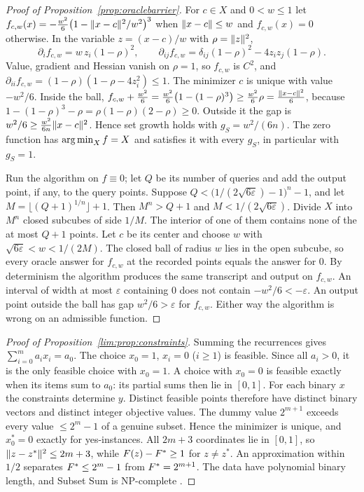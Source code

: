 \begin{proof}[Proof of Proposition~\ref{prop:oraclebarrier}]
For $c\in X$ and $0<w\le1$ let
$f_{c,w}(x)=-\frac{w^2}6\bigl(1-\lVert x-c\rVert^2/w^2\bigr)^3$ when
$\lVert x-c\rVert\le w$ and $f_{c,w}(x)=0$ otherwise. In the variable $z=(x-c)/w$
with $\rho=\lVert z\rVert^2$,
\[
\partial_if_{c,w}=w\,z_i(1-\rho)^2,\qquad
\partial_{ij}f_{c,w}=\delta_{ij}(1-\rho)^2-4z_iz_j(1-\rho).
\]
Value, gradient and Hessian vanish on $\rho=1$, so $f_{c,w}$ is $C^2$, and
$\partial_{ii}f_{c,w}=(1-\rho)(1-\rho-4z_i^2)\le1$. The minimizer $c$ is
unique with value $-w^2/6$. Inside the ball,
$f_{c,w}+\frac{w^2}6=\frac{w^2}6\bigl(1-(1-\rho)^3\bigr)\ge\frac{w^2}6\rho
=\frac{\lVert x-c\rVert^2}6$, because $1-(1-\rho)^3-\rho=\rho(1-\rho)(2-\rho)\ge0$.
Outside it the gap is $w^2/6\ge\frac{w^2}{6n}\lVert x-c\rVert^2$. Hence set growth
holds with $g_S=w^2/(6n)$. The zero function has $\operatorname*{arg\,min}_Xf=X$ and satisfies
it with every $g_S$, in particular with $g_S=1$.

Run the algorithm on $f\equiv0$; let $Q$ be its number of queries and add
the output point, if any, to the query points. Suppose
$Q<\bigl(1/(2\sqrt{6\varepsilon})-1\bigr)^n-1$, and let
$M=\lfloor(Q+1)^{1/n}\rfloor+1$. Then $M^n>Q+1$ and $M<1/(2\sqrt{6\varepsilon})$.
Divide $X$ into $M^n$ closed subcubes of side $1/M$. The interior of one of
them contains none of the at most $Q+1$ points. Let $c$ be its center and
choose $w$ with $\sqrt{6\varepsilon}<w<1/(2M)$. The closed ball of radius $w$
lies in the open subcube, so every oracle answer for $f_{c,w}$ at the
recorded points equals the answer for $0$. By determinism the algorithm
produces the same transcript and output on $f_{c,w}$. An interval of width at
most $\varepsilon$ containing $0$ does not contain $-w^2/6<-\varepsilon$. An
output point outside the ball has gap $w^2/6>\varepsilon$ for $f_{c,w}$.
Either way the algorithm is wrong on an admissible function.
\end{proof}

\begin{proof}[Proof of Proposition~\ref{lim:prop:constraints}]
Summing the recurrences gives $\sum_{i=0}^ma_ix_i=a_0$. The choice $x_0=1$,
$x_i=0$ ($i\ge1$) is feasible. Since all $a_i>0$, it is the only feasible
choice with $x_0=1$. A choice with $x_0=0$ is feasible exactly when its
items sum to $a_0$: its partial sums then lie in $[0,1]$. For each binary $x$
the constraints determine $y$. Distinct feasible points therefore have
distinct binary vectors and distinct integer objective values. The dummy
value $2^{m+1}$ exceeds every value $\le2^m-1$ of a genuine subset. Hence
the minimizer is unique, and $x_0^*=0$ exactly for yes-instances. All
$2m+3$ coordinates lie in $[0,1]$, so $\lVert z-z^*\rVert^2\le2m+3$, while
$F(z)-F^{*}\ge1$ for $z\ne z^*$. An approximation within $1/2$ separates
$F^{*}\le2^m-1$ from $F^{*}=2^{m+1}$. The data have polynomial binary length,
and Subset Sum is NP-complete \cite{GareyJohnson1979}.
\end{proof}
